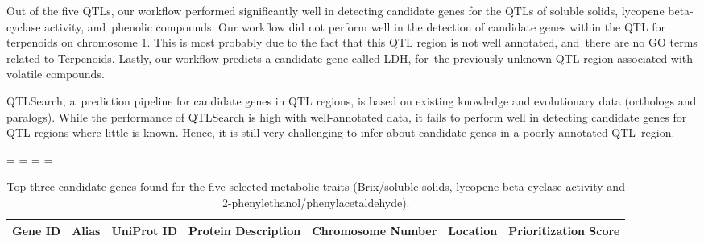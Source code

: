 \documentclass[applsci,article,accept,moreauthors,pdftex]{Definitions/mdpi}
\begin{document}
{{Out of the five QTLs, %
our workflow performed significantly well in detecting candidate genes for the QTLs of soluble solids, lycopene beta-cyclase activity, and~phenolic compounds. Our workflow did not perform well in the detection of candidate genes within the QTL for terpenoids on chromosome 1. This is most probably due to the fact that this QTL region is not well annotated, and~there are no GO terms related to Terpenoids. Lastly, our workflow predicts a candidate gene called LDH, for~the previously unknown QTL region associated with volatile compounds.} 

QTLSearch, a~prediction pipeline for candidate genes in QTL regions, %
is based on existing knowledge and evolutionary data (orthologs and paralogs). While the performance of QTLSearch is high with well-annotated data, it fails to perform well in detecting candidate genes for QTL regions where little is known.
Hence, it is %
still very challenging to infer about candidate genes in %
a poorly annotated QTL~region. %

\newpage
\paperwidth=\pdfpageheight
\paperheight=\pdfpagewidth
\pdfpageheight=\paperheight
\pdfpagewidth=\paperwidth
{}
\fancyheadoffset[LO,RE]{0cm}
\fancyheadoffset[RO,LE]{0cm}

\begin{table}[H]
\centering
\caption{Top three candidate genes found for the five selected metabolic traits %
(Brix/soluble solids, lycopene beta-cyclase activity and 2-phenylethanol/phenylacetaldehyde).} %
\label{c5:tab2}
{\footnotesize
\setlength{\tabcolsep}{2pt}
\begin{tabular}{ c  c  c  c  c  c  c }
\toprule
\textbf{Gene ID} & \textbf{Alias} & \textbf{UniProt ID} & \textbf{Protein Description} & \textbf{Chromosome Number} & \textbf{Location} & \textbf{Prioritization Score} \\
\midrule


\end{tabular}}
\end{table}}
\end{document}
